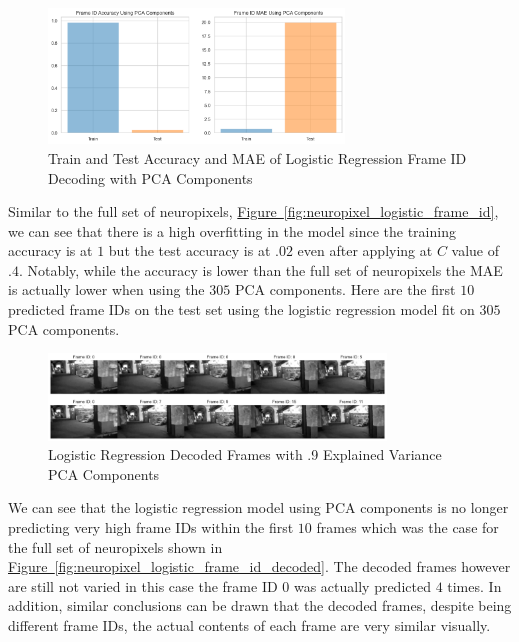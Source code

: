 \documentclass[12pt, letterpaper]{article}
\begin{document}
\begin{figure}[H]
    \centering
    \includegraphics[width=0.7\textwidth]{frame_id_metrics_logistic_C_.4_pca.png}
    \caption{Train and Test Accuracy and MAE of Logistic Regression Frame ID Decoding with PCA Components}
    \label{fig:logistic_pca_frame_id}
\end{figure}

Similar to the full set of neuropixels, \hyperref[fig:neuropixel_logistic_frame_id]{Figure~\ref{fig:neuropixel_logistic_frame_id}}, we can see that there is a high overfitting in the model since the training accuracy is at $1$ but the test accuracy is at $.02$ even after applying at $C$ value of $.4$. Notably, while the accuracy is lower than the full set of neuropixels the MAE is actually lower when using the $305$ PCA components. Here are the first $10$ predicted frame IDs on the test set using the logistic regression model fit on $305$ PCA components.

\begin{figure}[H]
    \centering
    \includegraphics[width=0.8\textwidth]{.9_pca_logistic_reg_video.png}
    \caption{Logistic Regression Decoded Frames with .9 Explained Variance PCA Components}
    \label{fig:pca_logistic_frame_id_decoded}
\end{figure}

We can see that the logistic regression model using PCA components is no longer predicting very high frame IDs within the first $10$ frames which was the case for the full set of neuropixels shown in \hyperref[fig:neuropixel_logistic_frame_id_decoded]{Figure~\ref{fig:neuropixel_logistic_frame_id_decoded}}. The decoded frames however are still not varied in this case the frame ID $0$ was actually predicted $4$ times. In addition, similar conclusions can be drawn that the decoded frames, despite being different frame IDs, the actual contents of each frame are very similar visually.
\end{document}
